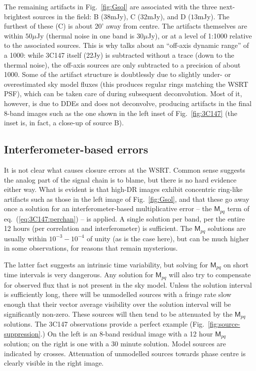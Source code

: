 \documentclass[]{aa}
\newcommand{\coh}[2]{\mathsf{{#1}}_{{#2}}}
\begin{document}
The remaining artifacts in Fig.~\ref{fig:Gsol} are associated with the three next-brightest sources in the field: B ($38$mJy), C ($32$mJy), and D ($13$mJy). The furthest of these (C) is about 20' away from centre. The artifacts themselves are within $50\mu$Jy (thermal noise in one band is $30 \mu$Jy), or at a level of 1:1000 relative to the associated sources. This is why \citet{deBruyn:million} talks about an ``off-axis dynamic range'' of a 1000: while 3C147 itself (22Jy) is subtracted without a trace (down to the thermal noise), the off-axis sources are only subtracted to a precision of about 1000. Some of the artifact structure is doubtlessly due to slightly under- or overestimated sky model fluxes (this produces regular rings matching the WSRT PSF), which can be taken care of during subsequent deconvolution. Most of it, however, is due to DDEs and does not deconvolve, producing artifacts in the final 8-band images such as the one shown in the left inset of Fig.~\ref{fig:3C147} (the inset is, in fact, a close-up of source B).

\subsection{Interferometer-based errors\label{sec:3C147:closure-errors}}

It is not clear what causes closure errors at the WSRT. Common sense suggests the analog part of the signal chain is to blame, but there is no hard evidence either way. What is evident is that high-DR images exhibit concentric ring-like artifacts such as those in the left image of Fig.~\ref{fig:Gsol}, and that these go away once a solution for an interferometer-based  multiplicative error -- the $\coh{M}{pq}$ term of eq.~(\ref{eq:3C147:perchan}) -- is applied. A single solution per band, per the entire 12 hours (per correlation and interferometer) is sufficient. The $\coh{M}{pq}$ solutions are usually within $10^{-3}-10^{-4}$ of unity (as is the case here), but can be much higher in some observations, for reasons that remain mysterious. 

The latter fact suggests an intrinsic time variability, but solving for $\coh{M}{pq}$ on short time intervals is very dangerous. Any solution for $\coh{M}{pq}$ will also try to compensate for observed flux that is not present in the sky model. Unless the solution interval is sufficiently long, there will be unmodelled sources with a fringe rate slow enough that their vector average visibility over the solution interval will be significantly non-zero. These sources will then tend to be attenuated by the $\coh{M}{pq}$ solutions. The 3C147 observations provide a perfect example (Fig.~\ref{fig:source-suppression}.) On the left is an 8-band residual image with a 12 hour $\coh{M}{pq}$ solution; on the right is one with a 30 minute solution. Model sources are indicated by crosses. Attenuation of unmodelled sources towards phase centre is clearly visible in the right image. 
\end{document}
